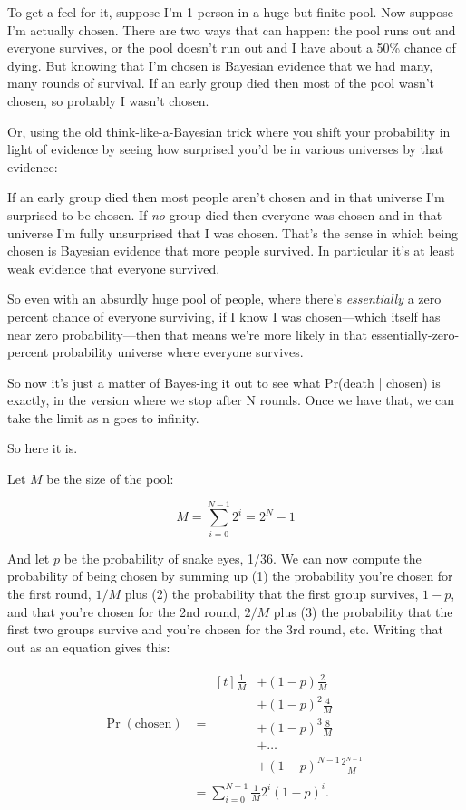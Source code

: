 \documentclass[article,twocolumn]{memoir}
\begin{document}
To get a feel for it, suppose I'm 1 person in a huge but finite pool. 
Now suppose I'm actually chosen. 
There are two ways that can happen: 
the pool runs out and everyone survives, or 
the pool doesn't run out and I have about a 50\% chance of dying. 
But knowing that I'm chosen is Bayesian evidence that we had many, many rounds of survival. 
If an early group died then most of the pool wasn't chosen, so probably I wasn't chosen.

Or, using the old think-like-a-Bayesian trick where you shift your probability in light of evidence by seeing how surprised you'd be in various universes by that evidence:

If an early group died then most people aren't chosen and in that universe I'm surprised to be chosen. 
If \emph{no} group died then everyone was chosen and in that universe I'm fully unsurprised that I was chosen. 
That's the sense in which being chosen is Bayesian evidence that more people survived. 
In particular it's at least weak evidence that everyone survived.

So even with an absurdly huge pool of people, where there's \emph{essentially} a zero percent chance of everyone surviving, if I know I was chosen---which itself has near zero probability---then that means we're more likely in that essentially-zero-percent probability universe where everyone survives.

So now it's just a matter of Bayes-ing it out to see what Pr(death | chosen) is exactly, in the version where we stop after N rounds.
Once we have that, we can take the limit as n goes to infinity.

So here it is.

Let $M$ be the size of the pool:

$$M = \sum_{i=0}^{N-1} 2^i = 2^N-1$$

And let $p$ be the probability of snake eyes, 1/36.
We can now compute the probability of being chosen by summing up 
(1) the probability you're chosen for the first round, $1/M$ plus 
(2) the probability that the first group survives, $1-p$, and that you're chosen for the 2nd round, $2/M$ plus 
(3) the probability that the first two groups survive and you're chosen for the 3rd round, etc.
Writing that out as an equation gives this:

\begin{align*}
\Pr(\text{chosen}) & = 
\begin{aligned}[t]
\tfrac{1}{M} & + (1-p)\tfrac{2}{M} \\
& + (1-p)^2\tfrac{4}{M} \\
& + (1-p)^3\tfrac{8}{M} \\
& + \ldots \\
& + (1-p)^{N-1}\frac{2^{N-1}}{M}
\end{aligned} \\
& = \sum_{i=0}^{N-1} \tfrac{1}{M} 2^i(1-p)^i.
\end{align*}
\end{document}
